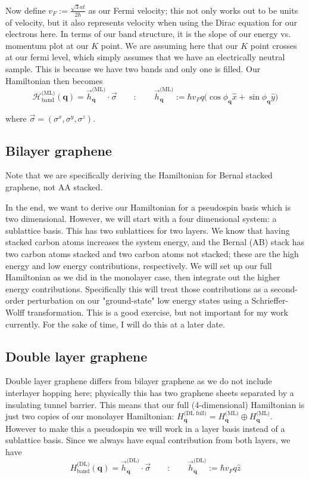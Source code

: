 \documentclass[12pt]{revtex4-2}
\begin{document}
Now define $v_F := \frac{\sqrt{3}at}{2\hbar}$ as our Fermi velocity; this not only works out to be units of velocity, but it also represents velocity when using the Dirac equation for our electrons here.  In terms of our band structure, it is the slope of our energy vs. momentum plot at our $K$ point.  We are assuming here that our $K$ point crosses at our fermi level, which simply assumes that we have an electrically neutral sample.  This is because we have two bands and only one is filled.  Our Hamiltonian then becomes
\begin{equation}
    \boxed{ \mathcal{H}_\text{band}^\text{(ML)}(\mathbf{q}) = \vec{h}_\mathbf{q}^{\text{(ML)}} \cdot \vec{\sigma} \qquad : \qquad \vec{h}_\mathbf{q}^{\text{(ML)}} := \hbar v_F q \big( \cos\phi_\mathbf{q} \hat{x} + \sin\phi_\mathbf{q} \hat{y} \big) }
\end{equation}

where $\vec{\sigma} = (\sigma^x,\sigma^y,\sigma^z)$.

\subsection{Bilayer graphene}
Note that we are specifically deriving the Hamiltonian for Bernal stacked graphene, not AA stacked.

In the end, we want to derive our Hamiltonian for a pseudospin basis which is two dimensional.  However, we will start with a four dimensional system: a sublattice basis.  This has two sublattices for two layers.  We know that having stacked carbon atoms increases the system energy, and the Bernal (AB) stack has two carbon atoms stacked and two carbon atoms not stacked; these are the high energy and low energy contributions, respectively.  We will set up our full Hamiltonian as we did in the monolayer case, then integrate out the higher energy contributions.  Specifically this will treat those contributions as a second-order perturbation on our "ground-state" low energy states using a Schrieffer-Wolff transformation.  This is a good exercise, but not important for my work currently.  For the sake of time, I will do this at a later date.

\subsection{Double layer graphene}
Double layer graphene differs from bilayer graphene as we do not include interlayer hopping here; physically this has two graphene sheets separated by a insulating tunnel barrier.  This means that our full (4-dimensional) Hamiltonian is just two copies of our monolayer Hamiltonian: $H_\mathbf{q}^\text{(DL full)} = H_\mathbf{q}^\text{(ML)} \oplus H_\mathbf{q}^\text{(ML)}.$  However to make this a pseudospin we will work in a layer basis instead of a sublattice basis.  Since we always have equal contribution from both layers, we have
\begin{equation}
    \boxed{ H_\text{band}^\text{(DL)}(\mathbf{q}) = \vec{h}_\mathbf{q}^{\text{(DL)}} \cdot \vec{\sigma} \qquad : \qquad \vec{h}_\mathbf{q}^{\text{(DL)}} := \hbar v_F q \hat{z} }
\end{equation}
\end{document}
